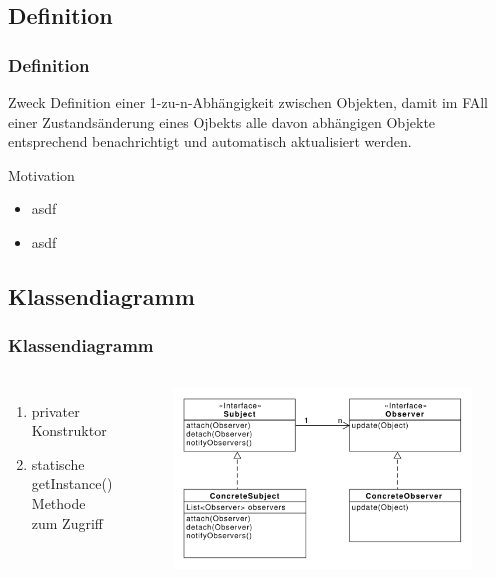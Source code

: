 \subsection{Definition}
\begin{frame}
  \frametitle{Definition}

  \begin{block}{Zweck}
  	Definition einer 1-zu-n-Abhängigkeit zwischen Objekten, damit im FAll einer Zustandsänderung eines Ojbekts alle davon abhängigen Objekte entsprechend benachrichtigt und automatisch aktualisiert werden.
  \end{block}
  	
  	
  \begin{block}{Motivation}
  	\begin{itemize}
  		\item asdf
  		\item asdf
  	\end{itemize}
  \end{block}
 \end{frame}

\subsection{Klassendiagramm}
\begin{frame}
	\frametitle{Klassendiagramm}
	
	\begin{columns} 
    		\begin{enumerate} 
    			\item privater Konstruktor 
    			\item statische getInstance() Methode zum Zugriff
    		\end{enumerate} 
    			\begin{figure}
					\includegraphics[width=\textwidth]{paper/observer/observer}
				\end{figure}
  	\end{columns} 
\end{frame}

